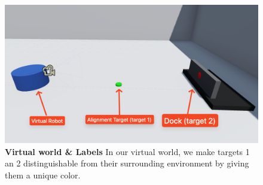 \begin{figure}
    \centering
    \includegraphics[width=\linewidth]{figures/src/virtual_world.png}
    \caption{
	    \textbf{Virtual world \& Labels} In our virtual world, we make targets 1 an 2 distinguishable from their surrounding environment by giving them a unique color.
    }
    \label{fig:virtual world}
\end{figure}
